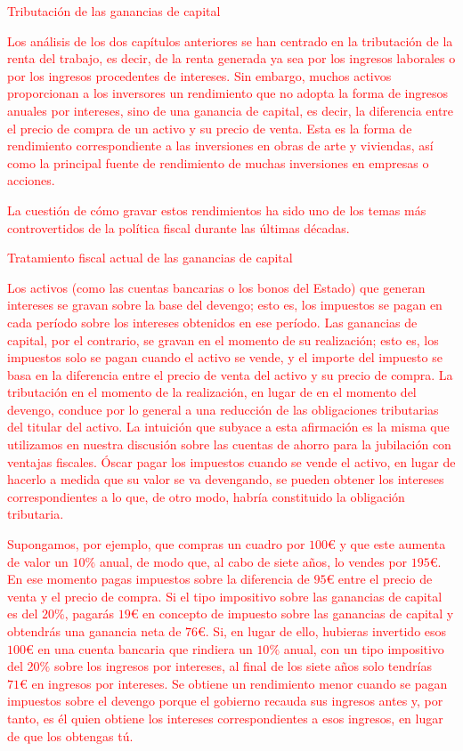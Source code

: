 \documentclass[10pt,a4paper]{article}
\begin{document}
\textcolor{red}{Tributación de las ganancias de capital

Los análisis de los dos capítulos anteriores se han centrado en la tributación de la renta del trabajo, es decir, de la renta generada ya sea por los ingresos laborales o por los ingresos procedentes de intereses. Sin embargo, muchos activos proporcionan a los inversores un rendimiento que no adopta la forma de ingresos anuales por intereses, sino de una ganancia de capital, es decir, la diferencia entre el precio de compra de un activo y su precio de venta. Esta es la forma de rendimiento correspondiente a las inversiones en obras de arte y viviendas, así como la principal fuente de rendimiento de muchas inversiones en empresas o acciones. 

La cuestión de cómo gravar estos rendimientos ha sido uno de los temas más controvertidos de la política fiscal durante las últimas décadas.

Tratamiento fiscal actual de las ganancias de capital

Los activos (como las cuentas bancarias o los bonos del Estado) que generan intereses se gravan sobre la base del devengo; esto es, los impuestos se pagan en cada período sobre los intereses obtenidos en ese período. Las ganancias de capital, por el contrario, se gravan en el momento de su realización; esto es, los impuestos solo se pagan cuando el activo se vende, y el importe del impuesto se basa en la diferencia entre el precio de venta del activo y su precio de compra. La tributación en el momento de la realización, en lugar de en el momento del devengo, conduce por lo general a una reducción de las obligaciones tributarias del titular del activo. La intuición que subyace a esta afirmación es la misma que utilizamos en nuestra discusión sobre las cuentas de ahorro para la jubilación con ventajas fiscales. Óscar pagar los impuestos cuando se vende el activo, en lugar de hacerlo a medida que su valor se va devengando, se pueden obtener los intereses correspondientes a lo que, de otro modo, habría constituido la obligación tributaria.

Supongamos, por ejemplo, que compras un cuadro por $100€$ y que este aumenta de valor un $10\%$ anual, de modo que, al cabo de siete años, lo vendes por $195€$. En ese momento pagas impuestos sobre la diferencia de $95€$ entre el precio de venta y el precio de compra. Si el tipo impositivo sobre las ganancias de capital es del $20\%$, pagarás $19€$ en concepto de impuesto sobre las ganancias de capital y obtendrás una ganancia neta de $76€$. Si, en lugar de ello, hubieras invertido esos $100€$ en una cuenta bancaria que rindiera un $10\%$ anual, con un tipo impositivo del $20\%$ sobre los ingresos por intereses, al final de los siete años solo tendrías $71€$ en ingresos por intereses. Se obtiene un rendimiento menor cuando se pagan impuestos sobre el devengo porque el gobierno recauda sus ingresos antes y, por tanto, es él quien obtiene los intereses correspondientes a esos ingresos, en lugar de que los obtengas tú. 

}
\end{document}

